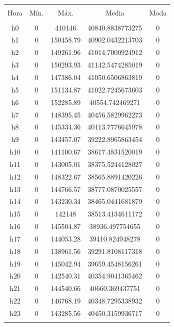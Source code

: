 \documentclass[conference, 10pt]{IEEEtran}
\begin{document}
\begin{table}[!htbp] \centering 
  \caption{} 
  \label{} 
\begin{tabular}{@{\extracolsep{5pt}} ccccc} 
\\[-1.8ex]\hline 
\hline \\[-1.8ex] 
Hora & Mín. & Máx. & Media & Moda \\ 
\hline \\[-1.8ex] 
h0 & 0 & 410146 & 40840.8838773275 & 0 \\ 
h1 & 0 & 150458.79 & 40902.0432213703 & 0 \\ 
h2 & 0 & 149261.96 & 41014.7000924912 & 0 \\ 
h3 & 0 & 150293.93 & 41142.5474285019 & 0 \\ 
h4 & 0 & 147386.04 & 41050.6506863819 & 0 \\ 
h5 & 0 & 151134.87 & 41022.7245673603 & 0 \\ 
h6 & 0 & 152285.89 & 40554.742469271 & 0 \\ 
h7 & 0 & 148395.45 & 40456.5829962273 & 0 \\ 
h8 & 0 & 145334.36 & 40113.7776645978 & 0 \\ 
h9 & 0 & 143457.07 & 39222.8965863454 & 0 \\ 
h10 & 0 & 141100.67 & 38617.4831520019 & 0 \\ 
h11 & 0 & 143005.01 & 38375.5244128027 & 0 \\ 
h12 & 0 & 148322.67 & 38565.8891420226 & 0 \\ 
h13 & 0 & 144766.57 & 38777.0870025557 & 0 \\ 
h14 & 0 & 143230.34 & 38465.0441681879 & 0 \\ 
h15 & 0 & 142148 & 38513.4134611172 & 0 \\ 
h16 & 0 & 145504.87 & 38936.497754655 & 0 \\ 
h17 & 0 & 144053.28 & 39410.824948278 & 0 \\ 
h18 & 0 & 138961.56 & 39291.8108117318 & 0 \\ 
h19 & 0 & 145042.94 & 39659.4548156261 & 0 \\ 
h20 & 0 & 142540.31 & 40354.9041365462 & 0 \\ 
h21 & 0 & 144540.66 & 40660.369437751 & 0 \\ 
h22 & 0 & 146768.19 & 40348.7295338932 & 0 \\ 
h23 & 0 & 143285.56 & 40450.3159936717 & 0 \\ 
\hline \\[-1.8ex] 
\end{tabular} 
\end{table}
\end{document}

